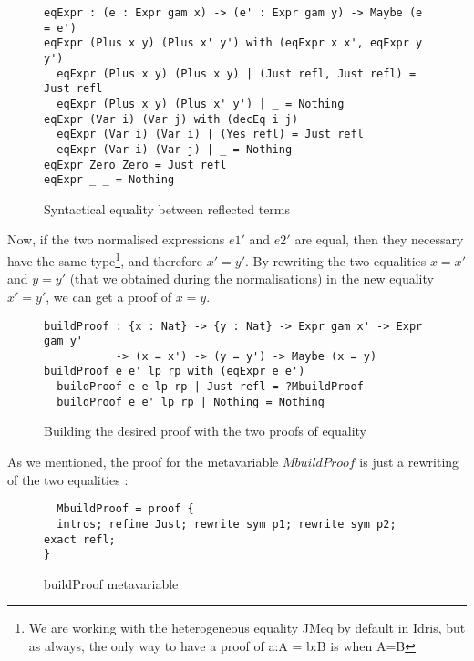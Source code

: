 \begin{figure}[H]
\figrule
\begin{center}
\begin{verbatim}
eqExpr : (e : Expr gam x) -> (e' : Expr gam y) -> Maybe (e = e')
eqExpr (Plus x y) (Plus x' y') with (eqExpr x x', eqExpr y y')
  eqExpr (Plus x y) (Plus x y) | (Just refl, Just refl) = Just refl
  eqExpr (Plus x y) (Plus x' y') | _ = Nothing
eqExpr (Var i) (Var j) with (decEq i j)
  eqExpr (Var i) (Var i) | (Yes refl) = Just refl
  eqExpr (Var i) (Var j) | _ = Nothing
eqExpr Zero Zero = Just refl
eqExpr _ _ = Nothing
\end{verbatim}
\end{center}
\caption{Syntactical equality between reflected terms}
\figrule
\end{figure}


Now, if the two normalised expressions $e1'$ and $e2'$ are equal, then they necessary have the same type\footnote{We are working with the heterogeneous equality JMeq by default in Idris, but as always, the only way to have a proof of a:A = b:B is when A=B}, and therefore $x'=y'$.
By rewriting the two equalities $x=x'$ and $y=y'$ (that we obtained during the normalisations) in the new equality $x'=y'$, we can get a proof of $x=y$.

\begin{figure}[H]
\figrule
\begin{center}
\begin{verbatim}
buildProof : {x : Nat} -> {y : Nat} -> Expr gam x' -> Expr gam y' 
           -> (x = x') -> (y = y') -> Maybe (x = y)
buildProof e e' lp rp with (eqExpr e e')
  buildProof e e lp rp | Just refl = ?MbuildProof
  buildProof e e' lp rp | Nothing = Nothing
\end{verbatim}
\end{center}
\caption{Building the desired proof with the two proofs of equality}
\figrule
\end{figure}

As we mentioned, the proof for the metavariable $MbuildProof$ is just a rewriting of the two equalities :

\begin{figure}[H]
\figrule
\begin{center}
\begin{verbatim}
  MbuildProof = proof {
  intros; refine Just; rewrite sym p1; rewrite sym p2; exact refl;
}  
\end{verbatim}
\end{center}
\caption{buildProof metavariable}
\figrule
\end{figure}

